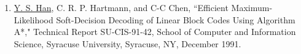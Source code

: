 \begin{llist}
\begin{itemize}
\begin{enumerate}
\item \underline{Y.  S.  Han}, C.  R.  P.  Hartmann, and C-C Chen, ``Efficient
Maximum-Likelihood Soft-Decision Decoding of Linear Block Codes Using
Algorithm A*," Technical Report SU-CIS-91-42, School of Computer and
Information Science, Syracuse University, Syracuse, NY, December 1991.
\end{enumerate}
\end{itemize}
\end{llist}

